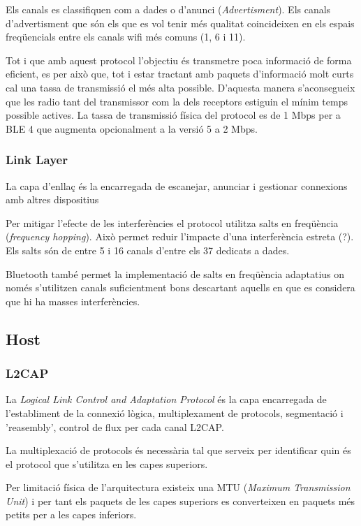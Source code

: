 Els canals es classifiquen com a dades o d'anunci (\textit{Advertisment}). Els canals d'advertisment que són els que es vol tenir més qualitat coincideixen en els espais freqüencials entre els canals wifi més comuns (1, 6 i 11).

Tot i que amb aquest protocol l'objectiu és transmetre poca informació de forma eficient, es per això que, tot i estar tractant amb paquets d'informació molt curts cal una tassa de transmissió el més alta possible. D'aquesta manera s'aconsegueix que les radio tant del transmissor com la dels receptors estiguin el mínim temps possible actives.
La tassa de transmissió física del protocol es de 1 Mbps per a BLE 4 que augmenta opcionalment a la versió 5 a 2 Mbps.


\subsubsection{Link Layer}

La capa d'enllaç és la encarregada de escanejar, anunciar i gestionar connexions amb altres dispositius

Per mitigar l'efecte de les interferències el protocol utilitza salts en freqüència (\textit{frequency hopping}). Això permet reduir l'impacte d'una interferència estreta (?). Els salts són de entre 5 i 16 canals d'entre els 37 dedicats a dades.

Bluetooth també permet la implementació de salts en freqüència adaptatius on només s'utilitzen canals suficientment bons descartant aquells en que es considera que hi ha masses interferències.

\subsection{Host}
\subsubsection{L2CAP}
La \textit{Logical Link Control and Adaptation Protocol} és la capa encarregada de l'establiment de la connexió lògica, multiplexament de protocols, segmentació i 'reasembly', control de flux per cada canal L2CAP.

La multiplexació de protocols és necessària tal que serveix per identificar quin és el protocol que s'utilitza en les capes superiors.

Per limitació física de l'arquitectura existeix una MTU (\textit{Maximum Transmission Unit}) i per tant els paquets de les capes superiors es converteixen en paquets més petits per a les capes inferiors.

